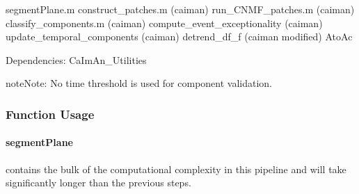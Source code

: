 \documentclass[letterpaper,10pt,english]{sphinxmanual}
\begin{document}
\sphinxAtStartPar
segmentPlane.m
\sphinxhyphen{} construct\_patches.m (caiman)
\sphinxhyphen{} run\_CNMF\_patches.m (caiman)
\sphinxhyphen{} classify\_components.m (caiman)
\sphinxhyphen{} compute\_event\_exceptionality (caiman)
\sphinxhyphen{} update\_temporal\_components (caiman)
\sphinxhyphen{} detrend\_df\_f (caiman \sphinxhyphen{} modified)
\sphinxhyphen{} AtoAc

\sphinxAtStartPar
Dependencies: CaImAn\_Utilities

\begin{sphinxadmonition}{note}{Note:}
\sphinxAtStartPar
No time threshold is used for component validation.
\end{sphinxadmonition}


\subsubsection{Function Usage}
\label{\detokenize{user_guide/segmentation:function-usage}}

\paragraph{segmentPlane}
\label{\detokenize{user_guide/segmentation:segmentplane}}
\sphinxAtStartPar
{\hyperref[\detokenize{user_guide/segmentation:segmentplane}]{}} contains the bulk of the computational complexity in this pipeline and will take significantly longer than the previous steps.
\end{document}
